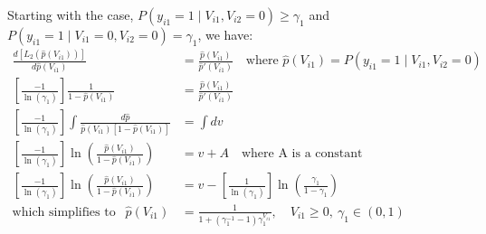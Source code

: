 Starting with the case, $P \left( y_{i1} = 1 \mid V_{i1}, V_{i2} = 0 \right) \geq \gamma_1$ and $P \left( y_{i1} = 1 \mid V_{i1} =0, V_{i2} = 0 \right) = \gamma_1$, we have:
\begin{equation}
\begin{aligned}
\frac{d \left[ L_{2} \left( \hat{p} \left( V_{i1} \right) \right) \right]}{d \hat{p} \left( V_{i1} \right)} &= \frac{\hat{p} \left( V_{i1} \right) }{ \hat{p}' \left( V_{i1} \right) } \quad \textrm{where } \hat{p} \left( V_{i1} \right) = P \left( y_{i1} = 1 \mid V_{i1}, V_{i2} = 0 \right) \\
\left[ \frac{-1}{\ln \left( \gamma_1 \right)} \right] \frac{1}{1 - \hat{p} \left( V_{i1} \right)} &= \frac{\hat{p} \left( V_{i1} \right) }{ \hat{p}' \left( V_{i1} \right) } \\
\left[ \frac{-1}{\ln \left( \gamma_1 \right)} \right] \int \frac{ d \hat{p} }{\hat{p} \left( V_{i1} \right) \left[ 1 - \hat{p} \left( V_{i1} \right) \right]} &= \int d v \\
\left[ \frac{-1}{\ln \left( \gamma_1 \right)} \right] \ln \left( \frac{ \hat{p} \left( V_{i1} \right) }{ 1 - \hat{p} \left( V_{i1} \right) } \right) &= v + A \quad \textrm{where A is a constant} \\
\left[ \frac{-1}{\ln \left( \gamma_1 \right)} \right] \ln \left( \frac{ \hat{p} \left( V_{i1} \right) }{ 1 - \hat{p} \left( V_{i1} \right) } \right) &= v - \left[ \frac{1}{\ln \left( \gamma_1 \right)} \right] \ln \left( \frac{ \gamma_1 }{ 1 - \gamma_1 } \right)\\
\textrm{which simplifies to } \ \  \hat{p} \left( V_{i1} \right) &= \frac{1}{1 + \left( \gamma_1^{-1} - 1 \right) \gamma_1^{V_{i1}} }, \quad V_{i1} \geq 0,\  \gamma_1 \in \left( 0, 1 \right)
\end{aligned}
\end{equation}

